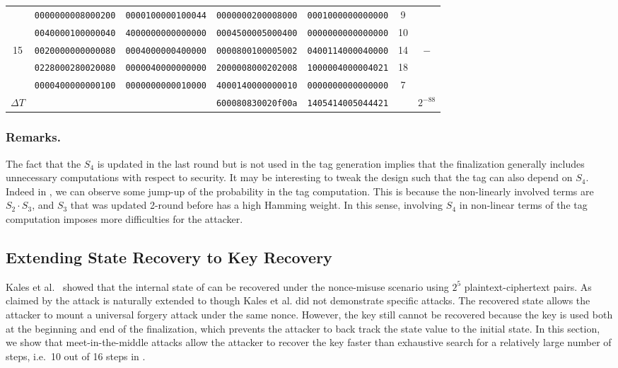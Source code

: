\begin{table}[!tb]
\begin{center}
{\begin{tabular}{ccccccc}
      & {\tt 0000000008000200} & {\tt 0000100000100044} & {\tt 0000000200008000} & {\tt 0001000000000000} & 9  & \\
      & {\tt 0040000100000040} & {\tt 4000000000000000} & {\tt 0004500005000400} & {\tt 0000000000000000} & 10 & \\
15    & {\tt 0020000000000080} & {\tt 0004000000400000} & {\tt 0000800100005002} & {\tt 0400114000040000} & 14 & $-$\\
      & {\tt 0228000280020080} & {\tt 0000040000000000} & {\tt 2000008000202008} & {\tt 1000004000004021} & 18 & \\
      & {\tt 0000400000000100} & {\tt 0000000000010000} & {\tt 4000140000000010} & {\tt 0000000000000000} & 7  & \\ \hline

$\Delta T$ &                   &                        & {\tt 600080830020f00a} & {\tt 1405414005044421} & & $2^{-88}$ \\ \hline
\end{tabular}
}
\end{center}
\end{table}

\subsubsection{Remarks.} The fact that the $S_4$ is updated in the last round but is not used in the tag generation implies that the \MORUS finalization generally includes unnecessary computations with respect to security. It may be interesting to tweak the design such that the tag can also depend on $S_4$. Indeed in , we can observe some jump-up of the probability in the tag computation. This is because the non-linearly involved terms are $S_2 \cdot S_3$, and $S_3$ that was updated 2-round before has a high Hamming weight. In this sense, involving $S_4$ in non-linear terms of the tag computation imposes more difficulties for the attacker.




\subsection{Extending State Recovery to Key Recovery}
\label{subsec/Ini}
Kales et al.~\cite{cryptoeprint:2017:1137} showed that the internal state of \MORUS[640] can be recovered under the nonce-misuse scenario using $2^5$ plaintext-ciphertext pairs. As claimed by \cite{cryptoeprint:2017:1137} the attack is naturally extended to \MORUS[1280] though Kales et al. \cite{cryptoeprint:2017:1137} did not demonstrate specific attacks. The recovered state allows the attacker to mount a universal forgery attack under the same nonce. However, the key still cannot be recovered because the key is used both at the beginning and end of the finalization, which prevents the attacker to back track the state value to the initial state. In this section, we show that meet-in-the-middle attacks allow the attacker to recover the key faster than exhaustive search for a relatively large number of steps, i.e.~10 out of 16 steps in \MORUS[1280]. 

